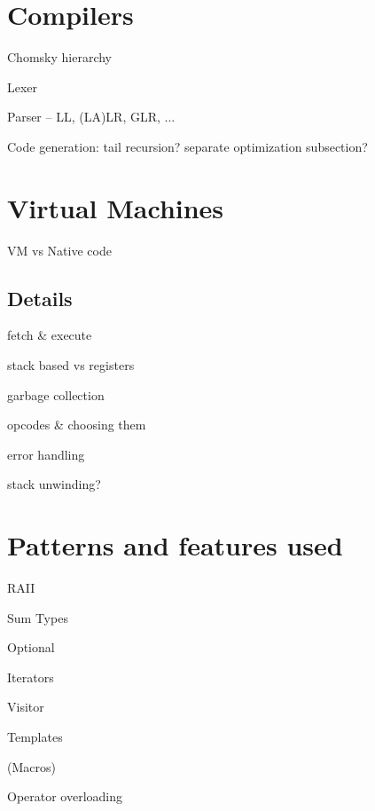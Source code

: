 	\section{Compilers}

		Chomsky hierarchy
		
		Lexer
		
		Parser -- LL, (LA)LR, GLR, ...
		
		Code generation: tail recursion? separate optimization subsection?

	\section{Virtual Machines}

		VM vs Native code
		
		\subsection{Details} %
			fetch \& execute
			
			stack based vs registers
			
			garbage collection
			
			opcodes \& choosing them
			
			error handling
			
			stack unwinding?
    
    \section{Patterns and features used}
    
        RAII
        
        Sum Types
        
        Optional
        
        Iterators
        
        Visitor
        
        Templates
        
        (Macros)
        
        Operator overloading
